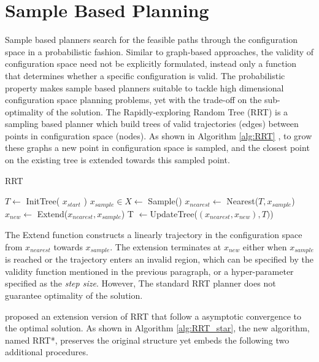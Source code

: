 \documentclass[../thesis.tex]{subfiles}
\begin{document}
\section{Sample Based Planning}
\label{sec:sample_based_planning}

Sample based planners search for the feasible paths through the configuration space in a probabilistic fashion. 
Similar to graph-based approaches, the validity of configuration space need not be explicitly formulated, instead only a function that determines whether a specific configuration is valid. 
The probabilistic property makes sample based planners suitable to tackle high dimensional configuration space planning problems, yet with the trade-off on the sub-optimality of the solution. 
The Rapidly-exploring Random Tree (RRT) is a sampling based planner which build trees of valid trajectories (edges) between points in configuration space (nodes).
As shown in Algorithm \ref{alg:RRT} \cite{lavalle1998rapidly}, to grow these graphs a new point in configuration space is sampled, and the closest point on the existing tree is extended towards this sampled point.

\begin{algorithm}
  \caption{RRT} \label{alg:RRT}
  \begin{algorithmic}[1]
    \State $T \leftarrow$ InitTree( $x_{start}$ )
	    \State $x_{sample} \in X \leftarrow$ Sample()
	    \State $x_{nearest} \leftarrow $ Nearest($T, x_{sample}$)
	    \State $x_{new} \leftarrow $ Extend($x_{nearest}, x_{sample}$)
	    \State T $\leftarrow $UpdateTree($(x_{nearest},x_{new}), T)$)
    \EndWhile
  \end{algorithmic}
\end{algorithm}

The Extend function constructs a linearly trajectory in the configuration space from $x_{nearest}$ towards $x_{sample}$. 
The extension terminates at $x_{new}$ either when $x_{sample}$ is reached or the trajectory enters an invalid region, which can be specified by the validity function mentioned in the previous paragraph, or a hyper-parameter specified as the \textit{step size}. 
However, The standard RRT planner does not guarantee optimality of the solution. 

\citet{karaman2011sampling} proposed an extension version of RRT that follow a asymptotic convergence to the optimal solution. 
As shown in Algorithm \ref{alg:RRT_star}, the new algorithm, named RRT*, preserves the original structure yet embeds the following two additional procedures.
\end{document}
